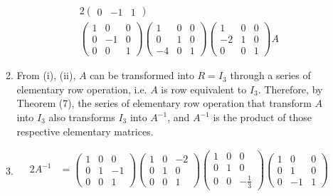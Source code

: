\documentclass{article}
\begin{document}
\begin{enumerate}
\begin{enumerate}[label={(\roman*)}]
\begin{alignat*}{2}
\begin{pmatrix}
          0 & -1 & 1
        \end{pmatrix}\\ 
        \begin{pmatrix}
          1 & 0 & 0 \\
          0 & -1 & 0 \\
          0 & 0 & 1
        \end{pmatrix}
        \begin{pmatrix}
          1 & 0 & 0 \\
          0 & 1 & 0 \\
          -4 & 0 & 1
        \end{pmatrix}
        \begin{pmatrix}
          1 & 0 & 0 \\
          -2 & 1 & 0 \\
          0 & 0 & 1
        \end{pmatrix}
        A
      \end{alignat*}
    \item From (i), (ii), $A$ can be transformed into $R = I_3$ through a series of elementary row operation, i.e. $A$ is row equivalent to $I_3$. Therefore, by Theorem (7), the series of elementary row operation that transform $A$ into $I_3$ also transforms $I_3$ into $A^{-1}$, and $A^{-1}$ is the product of those respective elementary matrices.
    \item 
      \begin{alignat*}{2}
        A^{-1} &= 
        \begin{pmatrix}
          1 & 0 & 0 \\
          0 & 1 & -1 \\
          0 & 0 & 1
        \end{pmatrix}
        \begin{pmatrix}
          1 & 0 & -2 \\
          0 & 1 & 0 \\
          0 & 0 & 1
        \end{pmatrix}
        \begin{pmatrix}
          1 & 0 & 0 \\
          0 & 1 & 0 \\
          0 & 0 & -\frac{1}{3}
        \end{pmatrix}
        \begin{pmatrix}
          1 & 0 & 0 \\
          0 & 1 & 0 \\
          0 & -1 & 1
        \end{pmatrix}\\ 

\end{alignat*}
\end{enumerate}
\end{enumerate}
\end{document}
